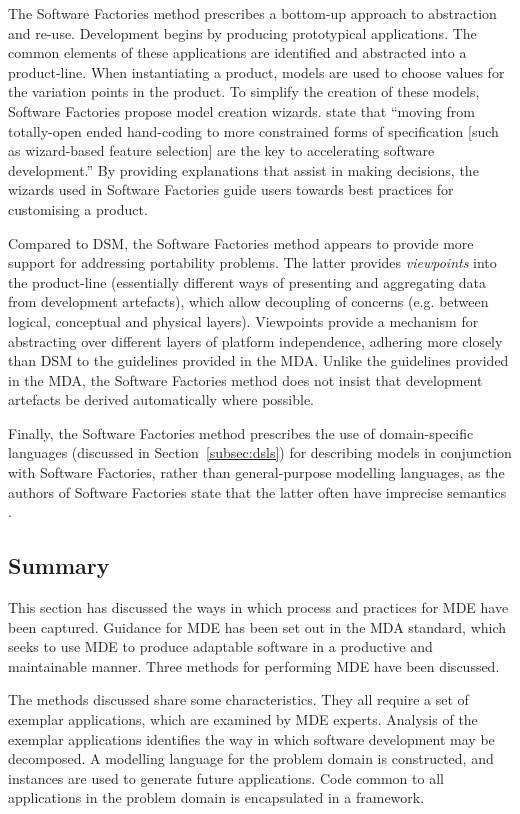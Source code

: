 The Software Factories method \cite{greenfield04software} prescribes a bottom-up approach to abstraction and re-use. Development begins by producing prototypical applications. The common elements of these applications are identified and abstracted into a product-line. When instantiating a product, models are used to choose values for the variation points in the product. To simplify the creation of these models, Software Factories propose model creation wizards. \cite[pg179]{greenfield04software} state that ``moving from totally-open ended hand-coding to more constrained forms of specification [such as wizard-based feature selection] are the key to accelerating software development.'' By providing explanations that assist in making decisions, the wizards used in Software Factories guide users towards best practices for customising a product.

Compared to DSM, the Software Factories method appears to provide more support for addressing portability problems. The latter provides \textit{viewpoints} into the product-line (essentially different ways of presenting and aggregating data from development artefacts), which allow decoupling of concerns (e.g. between logical, conceptual and physical layers). Viewpoints provide a mechanism for abstracting over different layers of platform independence, adhering more closely than DSM to the guidelines provided in the MDA. Unlike the guidelines provided in the MDA, the Software Factories method does not insist that development artefacts be derived automatically where possible.

Finally, the Software Factories method prescribes the use of domain-specific languages (discussed in Section~\ref{subsec:dsls}) for describing models in conjunction with Software Factories, rather than general-purpose modelling languages, as the authors of Software Factories state that the latter often have imprecise semantics \cite{greenfield04software}.

\subsection{Summary}
This section has discussed the ways in which process and practices for MDE have been captured. Guidance for MDE has been set out in the MDA standard, which seeks to use MDE to produce adaptable software in a productive and maintainable manner. Three methods for performing MDE have been discussed.
 
The methods discussed share some characteristics. They all require a set of exemplar applications, which are examined by MDE experts. Analysis of the exemplar applications identifies the way in which software development may be decomposed. A modelling language for the problem domain is constructed, and instances are used to generate future applications. Code common to all applications in the problem domain is encapsulated in a framework.

